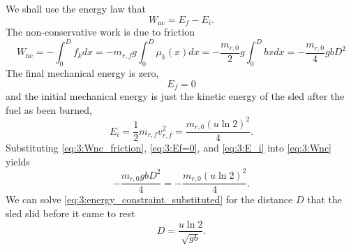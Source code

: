 \documentclass[solutions]{esg8012exam}
\begin{document}
\begin{enumerate}[(a)]
      We shall use the energy law that
      \begin{equation} W_\text{nc} =E_f -E_i . \label{eq:3:Wnc} \end{equation}
      The non-conservative work is due to friction
      \begin{equation} W_\text{nc} =-\int_0^D {f_k } dx=-m_{r,f} g\int_0^D {\mu_k (x)} dx=-\frac{m_{r,0}}{2} g\int_0^D {bx} dx=-\frac{m_{r,0}}{4} gb D^2 \label{eq:3:Wnc_friction} \end{equation}
      The final mechanical energy is zero,
      \begin{equation} E_f =0 \label{eq:3:Ef=0} \end{equation}
      and the initial mechanical energy is just the kinetic energy of the sled after the fuel as been burned,
      \begin{equation} E_i =\frac{1}{2}m_{r,f} v_{r,f}^2=\frac{m_{r,0} (u\ln 2)^2}{4}. \label{eq:3:E_i} \end{equation}
      Substituting \autoref{eq:3:Wnc_friction}, \autoref{eq:3:Ef=0}, and \autoref{eq:3:E_i} into \autoref{eq:3:Wnc} yields
      \begin{equation} -\frac{m_{r,0} gb D^2}{4}=-\frac{m_{r,0} (u\ln 2)^2}{4}. \label{eq:3:energy_constraint_substituted} \end{equation}
      We can solve \autoref{eq:3:energy_constraint_substituted} for the distance $D$ that the sled slid before it came to rest
      \begin{equation} D=\frac{u\ln 2}{\sqrt {gb}} . \label{eq:3:D} \end{equation}
  \end{enumerate}
\clearpage
\end{document}
